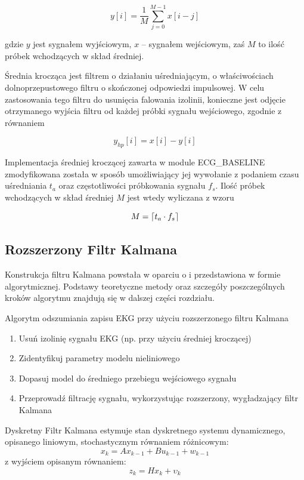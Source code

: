 \begin{equation}
y[i] = \frac{1}{M}\sum_{j=0}^{M-1}x[i - j]
\end{equation}

gdzie $y$ jest sygnałem wyjściowym, $x$ -- sygnałem wejściowym, zaś $M$ to ilość próbek wchodzących w skład średniej. 

Średnia krocząca jest filtrem o działaniu uśredniającym, o właściwościach dolnoprzepustowego filtru o skończonej odpowiedzi impulsowej. W celu zastosowania tego filtru do usunięcia falowania izolinii, konieczne jest odjęcie otrzymanego wyjścia filtru od każdej próbki sygnału wejściowego, zgodnie z równaniem

\begin{equation}
y_{hp}[i] = x[i] - y[i]
\end{equation}

Implementacja średniej kroczącej zawarta w module ECG\_BASELINE zmodyfikowana została w sposób umożliwiający jej wywołanie z podaniem czasu uśredniania $t_a$ oraz częstotliwości próbkowania sygnału $f_s$. Ilość próbek wchodzących w skład średniej $M$ jest wtedy wyliczana z wzoru

\begin{equation}
M = \lceil t_a \cdot f_s\rceil
\end{equation}


\subsection{Rozszerzony Filtr Kalmana}
Konstrukcja filtru Kalmana powstała w oparciu o \cite{Sameni2005-1, Sameni2005-2} i przedstawiona w formie algorytmicznej. Podstawy teoretyczne metody oraz szczegóły poszczególnych kroków algorytmu znajdują się w dalszej części rozdziału.

Algorytm odszumiania zapisu EKG przy użyciu rozszerzonego filtru Kalmana
\begin{enumerate}
\item Usuń izolinię sygnału EKG (np. przy użyciu średniej kroczącej)
\item Zidentyfikuj parametry modelu nieliniowego
\item Dopasuj model do średniego przebiegu wejściowego sygnału
\item Przeprowadź filtrację sygnału, wykorzystując rozszerzony, wygładzający filtr Kalmana
\end{enumerate}

Dyskretny Filtr Kalmana estymuje stan dyskretnego systemu dynamicznego, opisanego liniowym, stochastycznym równaniem różnicowym:
\begin{equation}
 x_k = Ax_{k-1} + Bu_{k-1} + w_{k-1}
\end{equation}
z wyjściem opisanym równaniem:
\begin{equation}
 z_k = Hx_k + \upsilon_k
\end{equation}

